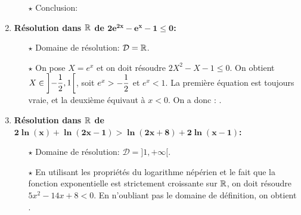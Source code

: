 \documentclass[a4paper, 11pt]{article}
\begin{document}
\begin{correction}
\begin{enumerate}
\begin{itemize}
\item[$\star$] Conclusion: 
\end{itemize}
\item \textbf{R\'esolution dans $\mathbf{\mathbb{R}}$ de $\mathbf{2e^{2x}-e^x-1\leq 0}$:}\\
\noindent \begin{itemize}
\item[$\star$] Domaine de r\'esolution: $\mathcal{D}=\mathbb{R}$.
\item[$\star$] On pose $X=e^x$ et on doit r\'esoudre $2X^2-X-1\leq 0$. On obtient $X \in \left] -\displaystyle \frac{1}{2}, 1\right[$, soit $e^x>\displaystyle - \frac{1}{2}$ et $e^x <1$. La première \'equation est toujours vraie, et la deuxi\`eme \'equivaut  \`a $x<0$. On a donc : .
\end{itemize} 
\item \textbf{R\'esolution dans $\mathbf{\mathbb{R}}$ de $\mathbf{2\ln{(x)}+\ln{(2x-1)}>\ln{(2x+8)}+2\ln{(x-1)}}$:}\\
\noindent \begin{itemize}
\item[$\star$] Domaine de r\'esolution: $\mathcal{D}=\rbrack 1,+\infty\lbrack$.
\item[$\star$] En utilisant les propri\'et\'es du logarithme n\'ep\'erien et le fait que la fonction exponentielle est strictement croissante sur $\mathbb{R}$, on doit r\'esoudre $5x^2-14x+8<0$. En n'oubliant pas le domaine de d\'efinition, on obtient .

\end{itemize}
\end{enumerate}
\end{correction}
\end{document}
